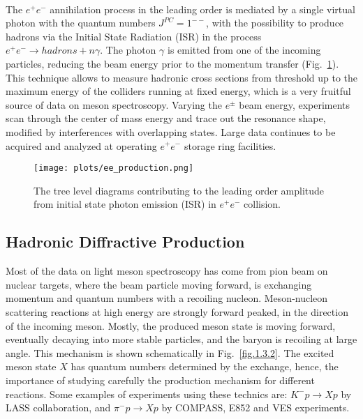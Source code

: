 ~\par The $e^{+}e^{-}$ annihilation process in the leading order is mediated by a single virtual photon with the quantum numbers $J^{PC} = 1^{--}$, with the possibility to produce hadrons via the Initial State Radiation (ISR) in the process $e^{+}e^{-} \rightarrow hadrons + n\gamma$. The photon $\gamma$ is emitted from one of the incoming particles, reducing the beam energy prior to the momentum transfer (Fig.~\ref{fig.1.3.1}). This technique allows to measure hadronic cross sections from threshold up to the maximum energy of the colliders running at fixed energy, which is a very fruitful source of data on meson spectroscopy. Varying the $e^{\pm}$ beam energy, experiments scan through the center of mass energy and trace out the resonance shape, modified by interferences with overlapping states. Large data continues to be acquired and analyzed at operating $e^{+}e^{-}$ storage ring facilities.

\begin{figure}[H]
    \centering
        \texttt{[image: plots/ee\_production.png]}
        \caption{The tree level diagrams contributing to the leading order amplitude from initial state photon emission (ISR) in $e^{+}e^{-}$ collision.}
        \label{fig.1.3.1}
\end{figure}
 
 \subsection{Hadronic Diffractive Production}

 Most of the data on light meson spectroscopy has come from pion beam on nuclear targets, where the beam particle moving forward, is exchanging momentum and quantum numbers with a recoiling nucleon. Meson-nucleon scattering reactions at high energy are strongly forward peaked, in the direction of the incoming meson. Mostly, the produced meson state is moving forward, eventually decaying into more stable particles, and the baryon is recoiling at large angle. This mechanism is shown schematically in Fig.~\ref{fig.1.3.2}. The excited meson state $X$ has quantum numbers determined by the exchange, hence, the importance of studying carefully the production mechanism for different reactions. Some examples of experiments using these technics are: $K^{-}p \rightarrow Xp$ by LASS collaboration, and $\pi^{-}p \rightarrow Xp$ by COMPASS, E852 and VES experiments.

